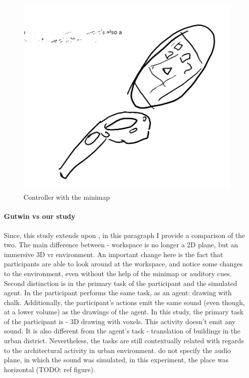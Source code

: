 \begin{figure}[h]
	\centering
	\includegraphics[width=0.7\linewidth]{figures/placeholders/minimap_controller}
	\caption{Controller with the minimap}
	\label{fig:minimap_controller}
\end{figure}


\paragraph{Gutwin vs our study}
Since, this study extends upon \cite{gutwin_chalk_2011}, in this paragraph I provide a comparison of the two.
The main difference between - workspace is no longer a 2D plane, but an immersive 3D \gls{vr} environment. An important change here is the fact that participants are able to look around at the workspace, and notice some changes to the environment, even without the help of the minimap or auditory cues.
Second distinction is in the primary task of the participant and the simulated agent. In \cite{gutwin_chalk_2011} the participant performs the same task, as an agent: drawing with chalk. Additionally, the participant's actions emit the same sound (even though, at a lower volume) as the drawings of the agent. In this study, the primary task of the participant is - 3D drawing with voxels. This activity doesn't emit any sound. It is also different from the agent's task - translation of buildings in the urban district. Nevertheless, the tasks are still contextually related with regards to the architectural activity in urban environment.
\cite{gutwin_chalk_2011} do not specify the audio plane, in which the sound was simulated, in this experiment, the place was horizontal (TODO: ref figure). 

